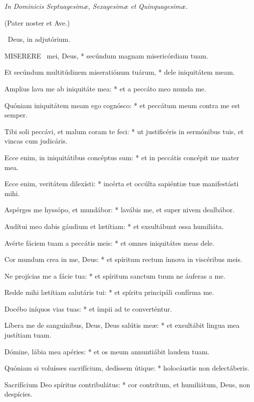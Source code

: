 \sectionornament


\textit{In Dominicis Septuagesimæ, Sexagesimæ et Quinquagesimæ.}

(Pater noster et Ave.)

\V\ Deus, in adjutórium.



\lettrine[lines=2]{M}{ISERERE} \textdagger\ mei, Deus, * secúndum magnam misericórdiam tuam.

Et secúndum multitúdinem miseratiónum tuárum, * dele iniquitátem meam.

Amplius lava me ab iniquitáte mea: * et a peccáto meo munda me.

Quóniam iniquitátem meam ego cognósco: * et peccátum meum contra me est semper.

Tibi soli peccávi, et malum coram te feci: * ut justificéris in sermónibus tuis, et vincas cum judicáris.

Ecce enim, in iniquitátibus concéptus sum: * et in peccátis concépit me mater mea.

Ecce enim, veritátem dilexísti: * incérta et occúlta sapiéntiæ tuæ manifestásti mihi.

Aspérges me hyssópo, et mundábor: * lavábis me, et super nivem dealbábor.

Audítui meo dabis gáudium et lætítiam: * et exsultábunt ossa humiliáta.

Avérte fáciem tuam a peccátis meis: * et omnes iniquitátes meas dele.

Cor mundum crea in me, Deus: * et spíritum rectum ínnova in viscéribus meis.

Ne projícias me a fácie tua: * et spíritum sanctum tuum ne áuferas a me.

Redde mihi lætítiam salutáris tui: * et spíritu principáli confírma me.

Docébo iníquos vias tuas: * et ímpii ad te converténtur.

Líbera me de sanguínibus, Deus, Deus salútis meæ: * et exsultábit lingua mea justítiam tuam.

Dómine, lábia mea apéries: * et os meum annuntiábit laudem tuam.

Quóniam si voluísses sacrifícium, dedíssem útique: * holocáustis non delectáberis.

Sacrifícium Deo spíritus contribulátus: * cor contrítum, et humiliátum, Deus, non despícies.

